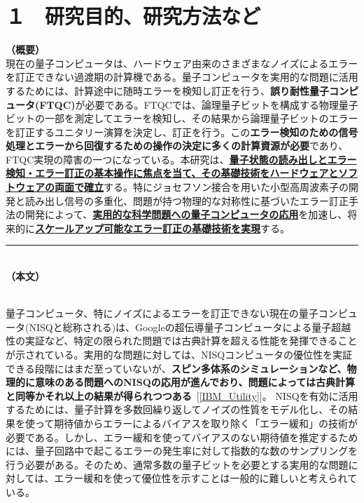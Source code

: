 \documentclass[11pt,a4j,dvipdfmx]{jarticle} 					%
\newcommand{\研究課題名}{誤り耐性量子コンピュータに向けた誤り訂正技術の開発(仮)}
\newcommand{\研究機関名}{東京大学}
\newcommand{\研究代表者氏名}{寺師弘二}
\newcommand{\研究期間の最終元号年度}{10}  %
\newcommand{\mybf}[1]{{\bfseries\sffamily#1}}
\begin{document}

\section{１　研究目的、研究方法など}

\noindent
\textbf{（概要）}\\
現在の量子コンピュータは、ハードウェア由来のさまざまなノイズによるエラーを訂正できない過渡期の計算機である。量子コンピュータを実用的な問題に活用するためには、計算途中に随時エラーを検知し訂正を行う、\mybf{誤り耐性量子コンピュータ(FTQC)}が必要である。FTQCでは、論理量子ビットを構成する物理量子ビットの一部を測定してエラーを検知し、その結果から論理量子ビットのエラーを訂正するユニタリー演算を決定し、訂正を行う。この\mybf{エラー検知のための信号処理とエラーから回復するための操作の決定に多くの計算資源が必要}であり、 FTQC実現の障害の一つになっている。本研究は、\mybf{\ul{量子状態の読み出しとエラー検知・エラー訂正の基本操作に焦点を当て、その基礎技術をハードウェアとソフトウェアの両面で確立}}する。特にジョセフソン接合を用いた小型高周波素子の開発と読み出し信号の多重化、問題が持つ物理的な対称性に基づいたエラー訂正手法の開発によって、\mybf{\ul{実用的な科学問題への量子コンピュータの応用}}を加速し、将来的に\mybf{\ul{スケールアップ可能なエラー訂正の基礎技術を実現}}する。

\noindent
\rule{\linewidth}{1pt}\\
\noindent
\textbf{（本文）}

\\
量子コンピュータ、特にノイズによるエラーを訂正できない現在の量子コンピュータ(NISQと総称される)は、Googleの超伝導量子コンピュータによる量子超越性の実証など、特定の限られた問題では古典計算を超える性能を発揮できることが示されている。実用的な問題に対しては、NISQコンピュータの優位性を実証できる段階にはまだ至っていないが、\mybf{スピン多体系のシミュレーションなど、物理的に意味のある問題へのNISQの応用が進んでおり、問題によっては古典計算と同等かそれ以上の結果が得られつつある}~[\ref{IBM_Utility}]。
NISQを有効に活用するためには、量子計算を多数回繰り返してノイズの性質をモデル化し、その結果を使って期待値からエラーによるバイアスを取り除く「エラー緩和」の技術が必要である。しかし、エラー緩和を使ってバイアスのない期待値を推定するためには、量子回路中で起こるエラーの発生率に対して指数的な数のサンプリングを行う必要がある。そのため、通常多数の量子ビットを必要とする実用的な問題に対しては、エラー緩和を使って優位性を示すことは一般的に難しいと考えられている。\\
\end{document}
